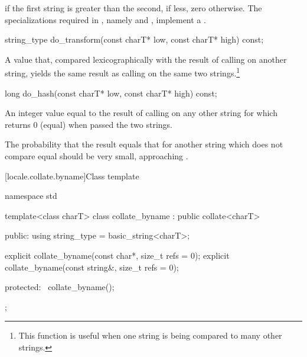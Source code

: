 \begin{itemdescr}
\pnum
\returns
{}
if the first string is greater than the second,
if less, zero otherwise.
The specializations required in , namely
and
,
implement
a .
\end{itemdescr}

%
\begin{itemdecl}
string_type do_transform(const charT* low, const charT* high) const;
\end{itemdecl}

\begin{itemdescr}
\pnum
\returns
A
value that, compared lexicographically with the result of calling
on another string, yields the same result as calling
on the same two strings.\footnote{This function is useful when one string is
being compared to many other strings.}
\end{itemdescr}

%
\begin{itemdecl}
long do_hash(const charT* low, const charT* high) const;
\end{itemdecl}

\begin{itemdescr}
\pnum
\returns
An integer value equal to the result of calling
on any other string for which
returns 0 (equal) when passed the two strings.
\begin{note}
The probability that the result equals that for another string which does
not compare equal should be very small, approaching
.
\end{note}
\end{itemdescr}

[locale.collate.byname]{Class template }

%
\begin{codeblock}
namespace std {
  template<class charT>
    class collate_byname : public collate<charT> {
    public:
      using string_type = basic_string<charT>;

      explicit collate_byname(const char*, size_t refs = 0);
      explicit collate_byname(const string&, size_t refs = 0);

    protected:
      ~collate_byname();
    };
}
\end{codeblock}

